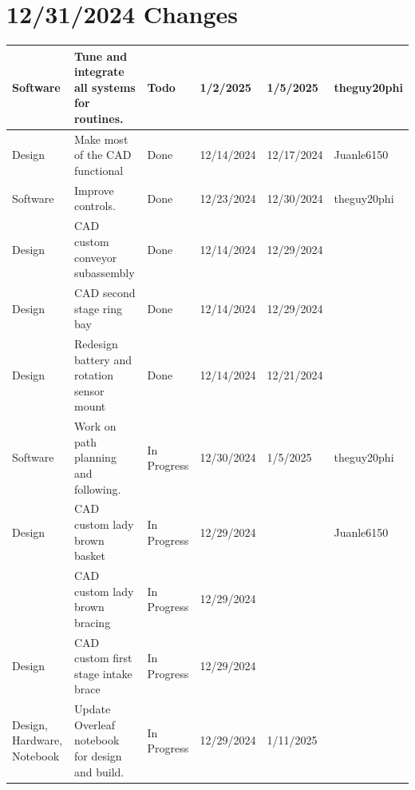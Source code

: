 \section{12/31/2024 Changes}
\begin{center}
\begin{longtable}{| p{40pt} | p{150pt} | p{35pt} | p{33pt} | p{33pt} | p{40pt} |}
\hline \rowcolor{IndianRed1}
Software & Tune and integrate all systems for routines. & Todo & 1/2/2025 & 1/5/2025 & theguy20phi \\
\hline \rowcolor{DarkSeaGreen1}
Design & Make most of the CAD functional & Done & 12/14/2024 & 12/17/2024 & Juanle6150 \\
\hline \rowcolor{DarkSeaGreen1}
Software & Improve controls. & Done & 12/23/2024 & 12/30/2024 & theguy20phi \\
\hline \rowcolor{DarkSeaGreen1}
Design & CAD custom conveyor subassembly & Done & 12/14/2024 & 12/29/2024 & \\
\hline \rowcolor{DarkSeaGreen1}
Design & CAD second stage ring bay & Done & 12/14/2024 & 12/29/2024 & \\
\hline \rowcolor{DarkSeaGreen1}
Design & Redesign battery and rotation sensor mount & Done & 12/14/2024 & 12/21/2024 & \\
\hline \rowcolor{LightGoldenrod1}
Software & Work on path planning and following. & In Progress & 12/30/2024 & 1/5/2025 & theguy20phi \\
\hline \rowcolor{LightGoldenrod1}
Design & CAD custom lady brown basket & In Progress & 12/29/2024 &  & Juanle6150 \\
\hline \rowcolor{LightGoldenrod1}
& CAD custom lady brown bracing & In Progress & 12/29/2024 &  & \\
\hline \rowcolor{LightGoldenrod1}
Design & CAD custom first stage intake brace & In Progress & 12/29/2024 &  & \\
\hline \rowcolor{LightGoldenrod1}
Design, Hardware, Notebook & Update Overleaf notebook for design and build. & In Progress & 12/29/2024 & 1/11/2025 & \\
\hline
\end{longtable}
\end{center}



